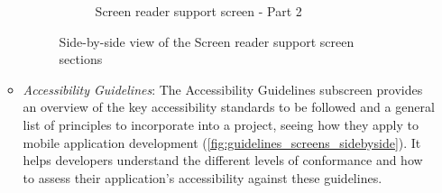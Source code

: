 \begin{enumerate}
\begin{itemize}
\begin{figure}[ht]
\begin{subfigure}[b]{0.48\textwidth}
                \caption{Screen reader support screen - Part 2}
                \label{fig:screen-reader-right}
            \end{subfigure}
            \caption{Side-by-side view of the Screen reader support screen sections}
            \label{fig:screen_reader_screens_sidebyside}
        \end{figure}

        \FloatBarrier

        \item \textit{Accessibility Guidelines}: The Accessibility Guidelines subscreen provides an overview of the key accessibility standards to be followed and a general list of principles to incorporate into a project, seeing how they apply to mobile application development (\ref{fig:guidelines_screens_sidebyside}). It helps developers understand the different levels of conformance and how to assess their application's accessibility against these guidelines.


\end{itemize}
\end{enumerate}
